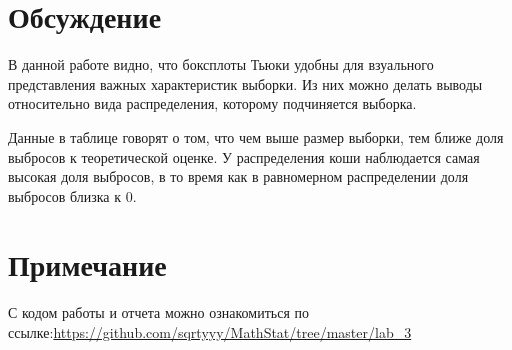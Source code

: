 \documentclass[a4paper]{article}
\begin{document}
\section{Обсуждение}
В данной работе видно, что боксплоты Тьюки удобны для взуального представления важных
характеристик выборки. Из них можно делать выводы относительно
вида распределения, которому подчиняется выборка.

Данные в таблице говорят о том, что чем выше размер выборки, тем ближе доля выбросов к теоретической оценке. У распределения коши наблюдается самая высокая доля выбросов, в то время как в равномерном распределении доля выбросов близка к 0.

\section{Примечание}

С кодом работы и отчета можно ознакомиться по ссылке:\;\url{https://github.com/sqrtyyy/MathStat/tree/master/lab_3}
\end{document}

